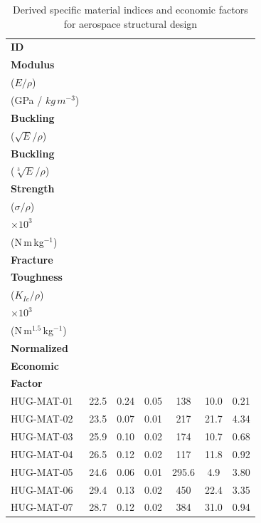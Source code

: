 \begin{table}[H]
\centering
\caption{Derived specific material indices and economic factors for aerospace structural design }
\label{tab:derived-material-properties}
\renewcommand{\arraystretch}{1.2}
\begin{tabular}{|l|c|c|c|c|c|c|}
\hline
\textbf{ID}
  & \makecell{\textbf{Specific}\\\textbf{Modulus}\\($E/\rho$)\\(GPa / $kg\,m^{-3}$)}
  & \makecell{\textbf{Column}\\\textbf{Buckling}\\($\sqrt{E}/\rho$)}
  & \makecell{\textbf{Plate}\\\textbf{Buckling}\\($\sqrt[3]{E}/\rho$)}
  & \makecell{\textbf{Specific}\\\textbf{Strength}\\($\sigma/\rho$)\\$\times10^{3}$\\(N\,m\,kg$^{-1}$)}
  & \makecell{\textbf{Specific}\\\textbf{Fracture}\\\textbf{Toughness}\\($K_{Ic}/\rho$)\\$\times10^{3}$\\(N\,m$^{1.5}$\,kg$^{-1}$)} 
  & \makecell{\textbf{Total}\\\textbf{Normalized}\\\textbf{Economic}\\\textbf{Factor}} \\
\hline\hline
HUG-MAT-01 & 22.5 & 0.24 & 0.05 & 138   & 10.0 & 0.21 \\ \hline
HUG-MAT-02 & 23.5 & 0.07 & 0.01 & 217   & 21.7 & 4.34 \\ \hline
HUG-MAT-03 & 25.9 & 0.10 & 0.02 & 174   & 10.7 & 0.68 \\ \hline
HUG-MAT-04 & 26.5 & 0.12 & 0.02 & 117   & 11.8 & 0.92 \\ \hline
HUG-MAT-05 & 24.6 & 0.06 & 0.01 & 295.6 & 4.9  & 3.80 \\ \hline
HUG-MAT-06 & 29.4 & 0.13 & 0.02 & 450   & 22.4 & 3.35 \\ \hline
HUG-MAT-07 & 28.7 & 0.12 & 0.02 & 384   & 31.0 & 0.94 \\
\hline
\end{tabular}
\end{table}


